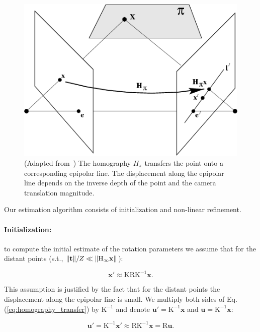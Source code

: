 \documentclass{report}
\DeclarePairedDelimiter{\norm}{\lVert}{\rVert}
\begin{document}
\begin{figure}[h]
  \centering
  \includegraphics[scale=.5]{fig85_adapted}
  \caption{(Adapted from~\cite{Hartley2004}) The homography $H_\pi$ transfers the point onto a corresponding epipolar line.  The displacement along the epipolar line depends on the inverse depth of the point and the camera translation magnitude.}
  \label{fig:feature_motion}
\end{figure}                                                             %

Our estimation algorithm consists of initialization and non-linear
refinement.
\paragraph{Initialization:} to compute the initial estimate of the rotation
parameters we assume that for the distant points (s.t., $\norm{\mathbf{t}}/Z \ll \norm{\mathrm{H_\infty}\mathbf{x}}$):

\begin{equation}\label{eq:homography_transfer}
  \mathbf{x}' \approx \mathrm{KRK^{-1}}\mathbf{x}.
\end{equation}

This assumption is justified by the fact that for the distant points
the displacement along the epipolar line is small. We multiply
both sides of Eq. (\ref{eq:homography_transfer}) by $\mathrm{K^{-1}}$
and denote $\mathbf{u'} = \mathrm{K^{-1}}\mathbf{x}$ and
$\mathbf{u} = \mathrm{K^{-1}}\mathbf{x}$:

\begin{equation}
  \mathbf{u'} = \mathrm{K^{-1}}\mathbf{x}' \approx \mathrm{RK^{-1}}\mathbf{x} = \mathrm{R}\mathbf{u}.
\end{equation}
\end{document}
